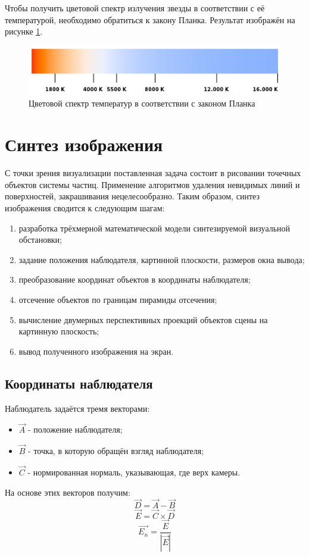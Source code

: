 Чтобы получить цветовой спектр излучения звезды в соответствии с её температурой, необходимо обратиться к закону Планка. Результат изображён на рисунке \ref{img:spectrum}.
\begin{figure}[H]
    \centering
	\includegraphics[scale=0.6]{image/spectrum.png}
	\caption{Цветовой спектр температур в соответствии с законом Планка}
	\label{img:spectrum}
\end{figure}

\section{Синтез изображения}
С точки зрения визуализации поставленная задача состоит в рисовании точечных объектов системы частиц. Применение алгоритмов удаления невидимых линий и поверхностей, закрашивания нецелесообразно. Таким образом, синтез изображения сводится к следующим шагам:
\begin{enumerate}
	\item разработка трёхмерной математической модели синтезируемой визуальной обстановки;
	\item задание положения наблюдателя, картинной плоскости, размеров окна вывода;
 	\item преобразование координат объектов в координаты наблюдателя;
	\item отсечение объектов по границам пирамиды отсечения;
	\item вычисление двумерных перспективных проекций объектов сцены на картинную плоскость;
	\item вывод полученного изображения на экран.
\end{enumerate}

\subsection{Координаты наблюдателя}

Наблюдатель задаётся тремя векторами:
\begin{itemize}
	\item $\vec{A}$ - положение наблюдателя;
	\item $\vec{B}$ - точка, в которую обращён взгляд наблюдателя;
	\item $\vec{C}$ - нормированная нормаль, указывающая, где верх камеры.
\end{itemize}
На основе этих векторов получим:
\begin{equation}
	\vec{D} = \vec{A} - \vec{B}
\end{equation}
\begin{equation}
	\vec{E} = \vec{C} \times{} \vec{D}
\end{equation}
\begin{equation}
	\vec{E_n} = \frac{\vec{E}}{|\vec{E}|}
\end{equation}

